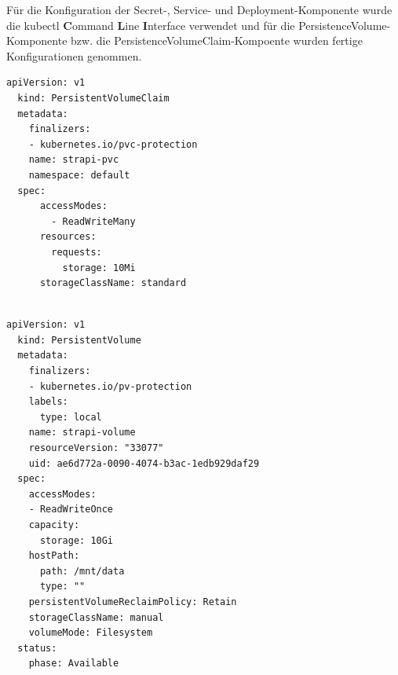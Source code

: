 Für die Konfiguration der Secret-, Service- und Deployment-Komponente wurde die kubectl \textbf{C}ommand \textbf{L}ine \textbf{I}nterface verwendet
und für die PersistenceVolume-Komponente bzw. die PersistenceVolumeClaim-Kompoente wurden fertige Konfigurationen genommen.
\begin{lstlisting}[caption=K8S PVC]
  apiVersion: v1
  kind: PersistentVolumeClaim
  metadata:
    finalizers:
    - kubernetes.io/pvc-protection
    name: strapi-pvc
    namespace: default
  spec:
      accessModes:
        - ReadWriteMany
      resources:
        requests:
          storage: 10Mi
      storageClassName: standard
    
\end{lstlisting}


\begin{lstlisting}[caption=K8S PV]
  apiVersion: v1
  kind: PersistentVolume
  metadata:
    finalizers:
    - kubernetes.io/pv-protection
    labels:
      type: local
    name: strapi-volume
    resourceVersion: "33077"
    uid: ae6d772a-0090-4074-b3ac-1edb929daf29
  spec:
    accessModes:
    - ReadWriteOnce
    capacity:
      storage: 10Gi
    hostPath:
      path: /mnt/data
      type: ""
    persistentVolumeReclaimPolicy: Retain
    storageClassName: manual
    volumeMode: Filesystem
  status:
    phase: Available
    
\end{lstlisting}



